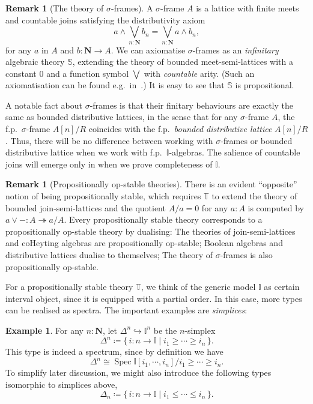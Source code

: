 \documentclass[a4paper,12pt]{amsart}
\theoremstyle{definition}
\newtheorem{example}[theorem]{Example}
\newtheorem{remark}[theorem]{Remark}
\newcommand{\mb}[1]{\mathbf{#1}}
\newcommand{\mbb}[1]{\mathbb{#1}}
\newcommand{\T}{\mbb T}
\newcommand{\I}{\mbb I}
\newcommand{\scomp}[2]{\{\,#1\mid#2\,\}}
\newcommand{\surj}{\twoheadrightarrow}
\newcommand{\hook}{\hookrightarrow}
\newcommand{\N}{\mb N}
\newcommand{\spec}{\operatorname{Spec}}
\begin{document}
\begin{remark}[The theory of $\sigma$-frames]\label{rem:sigmaframe}
  A $\sigma$-frame $A$ is a lattice with finite meets and countable joins satisfying the distributivity axiom 
  \[ a \wedge \bigvee_{n:\N} b_n = \bigvee_{n:\N} a \wedge b_n, \]
  for any $a$ in $A$ and $b \colon \N \to A$. We can axiomatise $\sigma$-frames as an \emph{infinitary} algebraic theory $\mbb S$, extending the theory of bounded meet-semi-lattices with a constant $0$ and a function symbol $\bigvee$ with \emph{countable} arity. (Such an axiomatisation can be found e.g.\ in~\citet[Exa.~3.26]{adamek1994locally}.) It is easy to see that $\mbb S$ is propositional. 

  A notable fact about $\sigma$-frames is that their finitary behaviours are exactly the same as bounded distributive lattices, in the sense that for any $\sigma$-frame $A$, the f.p.\ $\sigma$-frame $A[n]/R$ coincides with the f.p.\ \emph{bounded distributive lattice} $A[n]/R$. Thus, there will be no difference between working with $\sigma$-frames or bounded distributive lattice when we work with f.p.\ $\I$-algebras. The salience of countable joins will emerge only in  when we prove completeness of $\I$.
\end{remark}

\begin{remark}[Propositionally op-stable theories]\label{rem:opprop}
  There is an evident ``opposite'' notion of being propositionally stable, which requires $\T$ to extend the theory of bounded join-semi-lattices and the quotient $A/a = 0$ for any $a:A$ is computed by $a \vee - : A \surj a/A$. Every propositionally stable theory corresponds to a propositionally op-stable theory by dualising: The theories of join-semi-lattices and coHeyting algebras are propositionally op-stable; Boolean algebras and distributive lattices dualise to themselves; The theory of $\sigma$-frames is also propositionally op-stable.
\end{remark}

For a propositionally stable theory $\T$, we think of the generic model $\I$ as certain interval object, since it is equipped with a partial order. In this case, more types can be realised as spectra. The important examples are \emph{simplices}:

\begin{example}\label{exm:simplicesaffine}
  For any $n : \N$, let $\Delta^n \hook \I^n$ be the $n$-simplex
  \[ \Delta^n \coloneq \scomp{i \colon n \to \I}{i_1 \ge \cdots \ge i_n}. \]
  This type is indeed a spectrum, since by definition we have
  \[ \Delta^n \cong \spec\I[i_1,\cdots,i_n]/i_1\ge\cdots\ge i_n. \]
  To simplify later discussion, we might also introduce the following types isomorphic to simplices above,
  \[ \Delta_n \coloneq \scomp{i \colon n \to \I}{i_1 \le \cdots \le i_n}. \]
\end{example}
\end{document}
